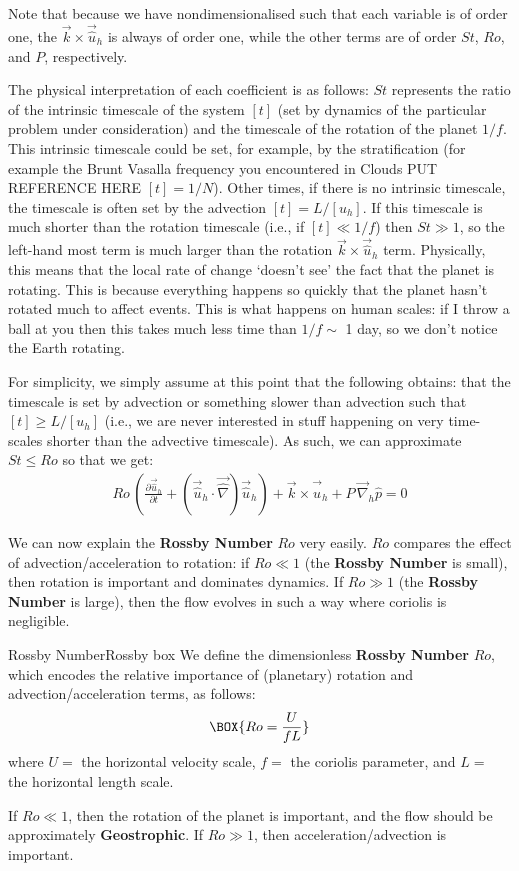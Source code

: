 Note that because we have nondimensionalised such that each variable is of order one, the $\vec{k}\times\vec{\hat{u}}_h$ is always of order one, while the other terms are of order $St$, $Ro$, and $P$, respectively.

The physical interpretation of each coefficient is as follows: $St$ represents the ratio of the intrinsic timescale of the system $[t]$ (set by dynamics of the particular problem under consideration) and the timescale of the rotation of the planet $1/f$. This intrinsic timescale could be set, for example, by the stratification (for example the Brunt Vasalla frequency you encountered in Clouds PUT REFERENCE HERE $[t]=1/N$). Other times, if there is no intrinsic timescale, the timescale is often set by the advection $[t]=L/[u_h]$. If this timescale is much shorter than the rotation timescale (i.e., if $[t]\ll 1/f$) then $St\gg 1$, so the left-hand most term is much larger than the rotation $\vec{k}\times\vec{\hat{u}}_h$ term. Physically, this means that the local rate of change `doesn't see' the fact that the planet is rotating. This is because everything happens so quickly that the planet hasn't rotated much to affect events. This is what happens on human scales: if I throw a ball at you then this takes much less time than $1/f\sim$ 1 day, so we don't notice the Earth rotating.

For simplicity, we simply assume at this point that the following obtains: that the timescale is set by advection or something slower than advection such that $[t]\geq L/[u_h]$ (i.e., we are never interested in stuff happening on very time-scales shorter than the advective timescale). As such, we can approximate $St\leq Ro$ so that we get:
\begin{align*}
    Ro\,\left( \frac{\partial\vec{\hat{u}}_h}{\partial t}+\left( \vec{\hat{u}}_h\cdot\vec{\hat{\nabla}} \right)\vec{\hat{u}}_h\right)+\vec{k}\times\vec{\hat{u}}_h +P\,\vec{\nabla}_h\hat{p}=0
\end{align*}

We can now explain the \textbf{Rossby Number} $Ro$ very easily. $Ro$ compares the effect of advection/acceleration to rotation: if $Ro \ll 1$ (the \textbf{Rossby Number} is small), then rotation is important and dominates dynamics. If $Ro \gg 1$ (the \textbf{Rossby Number} is large), then the flow evolves in such a way where coriolis is negligible.

\begin{fact}{Rossby Number}{Rossby box}\label{Rossby Box}
    We define the dimensionless \textbf{Rossby Number} $Ro$, which encodes the relative importance of (planetary) rotation and advection/acceleration terms, as follows:
    \begin{gather}
        \label{Rossby Number}
        \BOX{
            Ro=\frac{U}{fL}
        }
    \end{gather}
    where $U=$ the horizontal velocity scale, $f=$ the coriolis parameter, and $L=$ the horizontal length scale.
    
    If $Ro\ll 1$, then the rotation of the planet is important, and the flow should be approximately \textbf{Geostrophic}. If $Ro\gg 1$, then acceleration/advection is important.
\end{fact}

